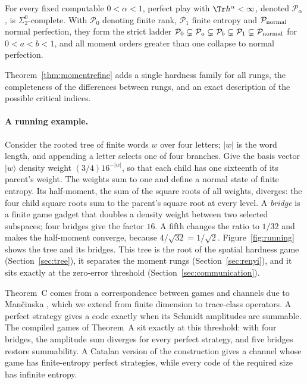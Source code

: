 \begin{theoremD}\label{thm:D}
For every fixed computable $0<\alpha<1$, perfect play with $\Tr h^\alpha<\infty$, denoted $\mathcal P_\alpha$, is $\Sigma^0_2$-complete. With $\mathcal P_0$ denoting finite rank, $\mathcal P_1$ finite entropy and $\mathcal P_{\rm normal}$ normal perfection, they form the strict ladder $\mathcal P_0\subsetneq\mathcal P_a\subsetneq\mathcal P_b\subsetneq\mathcal P_1\subsetneq\mathcal P_{\rm normal}$ for $0<a<b<1$, and all moment orders greater than one collapse to normal perfection.
\end{theoremD}

Theorem~\ref{thm:momentrefine} adds a single hardness family for all rungs, the completeness of the differences between rungs, and an exact description of the possible critical indices.

\paragraph{A running example.}
Consider the rooted tree of finite words $w$ over four letters; $|w|$ is the word length, and appending a letter selects one of four branches. Give the basis vector $|w\rangle$ density weight $(3/4)16^{-|w|}$, so that each child has one sixteenth of its parent's weight. The weights sum to one and define a normal state of finite entropy. Its half-moment, the sum of the square roots of all weights, diverges: the four child square roots sum to the parent's square root at every level. A \emph{bridge} is a finite game gadget that doubles a density weight between two selected subspaces; four bridges give the factor $16$. A fifth changes the ratio to $1/32$ and makes the half-moment converge, because $4/\sqrt{32}=1/\sqrt2$. Figure~\ref{fig:running} shows the tree and its bridges. This tree is the root of the spatial hardness game (Section~\ref{sec:tree}), it separates the moment rungs (Section~\ref{sec:renyi}), and it sits exactly at the zero-error threshold (Section~\ref{sec:communication}).

\begin{figure}[tb]
\centering


\end{figure}

Theorem~C comes from a correspondence between games and channels due to Man\v{c}inska \cite{Mancinska}, which we extend from finite dimension to trace-class operators. A perfect strategy gives a code exactly when its Schmidt amplitudes are summable. The compiled games of Theorem~A sit exactly at this threshold: with four bridges, the amplitude sum diverges for every perfect strategy, and five bridges restore summability. A Catalan version of the construction gives a channel whose game has finite-entropy perfect strategies, while every code of the required size has infinite entropy.

